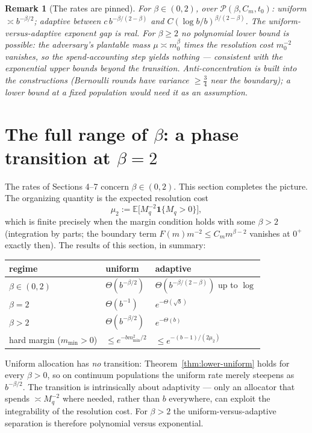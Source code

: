 \documentclass[11pt]{article}
\newtheorem{remark}{Remark}
\newcommand{\E}{\mathbb E}
\newcommand{\one}{\mathbf 1}
\newcommand{\class}{\mathcal P}
\newcommand{\mmin}{m_{\min}}
\begin{document}
\begin{remark}[The rates are pinned]
For $\beta\in(0,2)$, over $\class(\beta,C_m,t_0)$:
uniform $\asymp b^{-\beta/2}$; adaptive between $c\,b^{-\beta/(2-\beta)}$
and $C(\log b/b)^{\beta/(2-\beta)}$.  The uniform-versus-adaptive exponent
gap is real.  For $\beta\ge2$ no polynomial lower bound is possible: the
adversary's plantable mass $\mu\asymp m_0^\beta$ times the resolution cost
$m_0^{-2}$ vanishes, so the spend-accounting step yields nothing ---
consistent with the exponential upper bounds beyond the transition.
Anti-concentration is built into the constructions (Bernoulli rounds have
variance $\ge\frac34$ near the boundary); a lower bound at a \emph{fixed}
population would need it as an assumption.
\end{remark}

\section{The full range of $\beta$: a phase transition at $\beta=2$}
\label{sec:phase}

The rates of Sections 4--7 concern $\beta\in(0,2)$.  This section completes
the picture.  The organizing quantity is the expected resolution cost
\[
\mu_2:=\E\big[M_q^{-2}\one\{M_q>0\}\big],
\]
which is finite precisely when the margin condition holds with some
$\beta>2$ (integration by parts; the boundary term $F(m)m^{-2}\le
C_mm^{\beta-2}$ vanishes at $0^+$ exactly then).  The results of this
section, in summary:

\begin{center}
\begin{tabular}{lll}
\hline
regime & uniform & adaptive \\
\hline
$\beta\in(0,2)$ & $\Theta(b^{-\beta/2})$ &
$\Theta(b^{-\beta/(2-\beta)})$ up to $\log$ \\
$\beta=2$ & $\Theta(b^{-1})$ & $e^{-\Theta(\sqrt b)}$ \\
$\beta>2$ & $\Theta(b^{-\beta/2})$ & $e^{-\Theta(b)}$ \\
hard margin ($\mmin>0$) & $\le e^{-b\mmin^2/2}$ &
$\le e^{-(b-1)/(2\mu_2)}$ \\
\hline
\end{tabular}
\end{center}

\noindent
Uniform allocation has \emph{no} transition: Theorem~\ref{thm:lower-uniform}
holds for every $\beta>0$, so on continuum populations the uniform rate
merely steepens as $b^{-\beta/2}$.  The transition is intrinsically about
adaptivity --- only an allocator that spends $\asymp M_q^{-2}$ where needed,
rather than $b$ everywhere, can exploit the integrability of the resolution
cost.  For $\beta>2$ the uniform-versus-adaptive separation is therefore
polynomial versus exponential.
\end{document}
